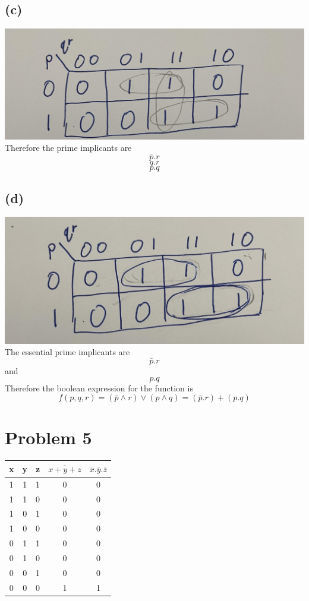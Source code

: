 \documentclass[12pt]{article}
\begin{document}
\subsection*{(c)}
\includegraphics[scale=0.1]{KmapPrime.jpg}\\
Therefore the prime implicants are 
$$\boxed{\bar{p}.r}$$
$$\boxed{q.r}$$
$$\boxed{p.q}$$
\subsection*{(d)}
\includegraphics[scale=0.1]{KmapFinal.jpg}\\
The essential prime implicants are
$$\bar{p}.r$$
and 
$$p.q$$
Therefore the boolean expression for the function is 
$$f(p,q,r)=\boxed{(\bar{p}\wedge r)\vee(p\wedge q)=(\bar{p}.r)+(p.q)}$$
\section*{Problem 5}
\begin{center}
    \begin{tabular}{ |c|c|c||c|c| }
        x & y & z & $\overline{x+y+z}$ & $\overline{x}.\bar{y}.\bar{z}$\\
        \hline
        1 & 1 & 1 & 0 & 0\\
        \hline
        1 & 1 & 0 & 0 & 0\\
        \hline
        1 & 0 & 1 & 0 & 0\\
        \hline
        1 & 0 & 0 & 0 & 0\\
        \hline
        0 & 1 & 1 & 0 & 0\\
        \hline
        0 & 1 & 0 & 0 & 0\\
        \hline
        0 & 0 & 1 & 0 & 0\\
        \hline
        0 & 0 & 0 & 1 & 1\\
        \hline
    \end{tabular}
\end{center}
\end{document}
